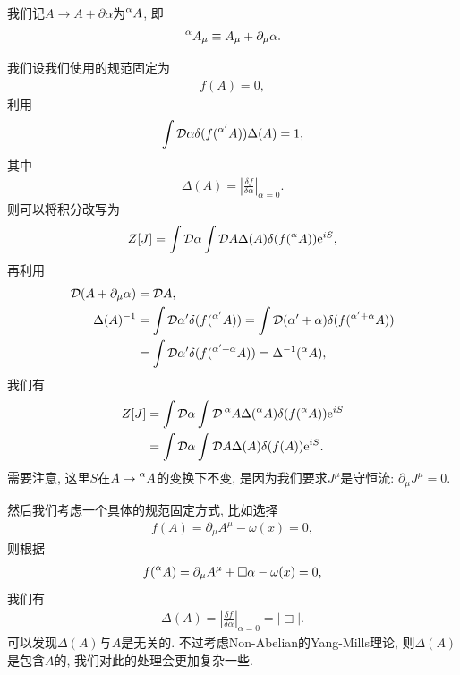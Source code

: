 我们记$A\to A+\partial\alpha$为$\prescript{\alpha}{}{A}$, 即
\begin{align}
    \prescript{\alpha}{}{A_\mu}\equiv A_\mu+\partial_\mu\alpha.
\end{align}

我们设我们使用的规范固定为
\begin{align}
    f(A)=0,
\end{align}
利用
\begin{align}
    \int\mathcal D\alpha\delta(f(\prescript{\alpha'}{}{A}))\Delta(A)=1, 
\end{align}
其中
\begin{align}
    \Delta(A)=\left|\frac{\delta f}{\delta\alpha}\right|_{\alpha=0}.
\end{align}
则可以将积分改写为
\begin{align}
    Z[J]=\int\mathcal D\alpha\int\mathcal DA\Delta(A)\delta(f(\prescript{\alpha}{}{A}))\exp{iS},
\end{align}
再利用
\begin{align}
    \mathcal D(A+\partial_\mu\alpha)&=\mathcal DA,\\
    \Delta(A)^{-1}&=\int\mathcal D\alpha'\delta(f(\prescript{\alpha'}{}{A}))=\int\mathcal D(\alpha'+\alpha)\delta(f(\prescript{\alpha'+\alpha}{}{A}))\notag\\
    &=\int\mathcal D\alpha'\delta(f(\prescript{\alpha'+\alpha}{}{A}))=\Delta^{-1}(\prescript{\alpha}{}{A}),
\end{align}
我们有
\begin{align}
    Z[J]&=\int\mathcal D\alpha\int\mathcal D\prescript{\alpha}{}{A}\Delta(\prescript{\alpha}{}{A})\delta(f(\prescript{\alpha}{}{A}))\exp{iS}\\
    &=\int\mathcal D\alpha\int\mathcal DA\Delta(A)\delta(f(A))\exp{iS}.
\end{align}
需要注意, 这里$S$在$A\to\prescript{\alpha}{}{A}$的变换下不变, 是因为我们要求$J^\mu$是守恒流: $\partial_\mu J^\mu=0$.

然后我们考虑一个具体的规范固定方式, 比如选择
\begin{align}
    f(A)=\partial_\mu A^\mu-\omega(x)=0,
\end{align}
则根据
\begin{align}
    f(\prescript{\alpha}{}{A})=\partial_\mu A^\mu+\Box\alpha-\omega(x)=0,
\end{align}
我们有
\begin{align}
    \Delta(A)=\left|\frac{\delta f}{\delta\alpha}\right|_{\alpha=0}=|\Box|.
\end{align}
可以发现$\Delta(A)$与$A$是无关的. 不过考虑Non-Abelian的Yang-Mills理论, 则$\Delta(A)$是包含$A$的, 我们对此的处理会更加复杂一些. 

